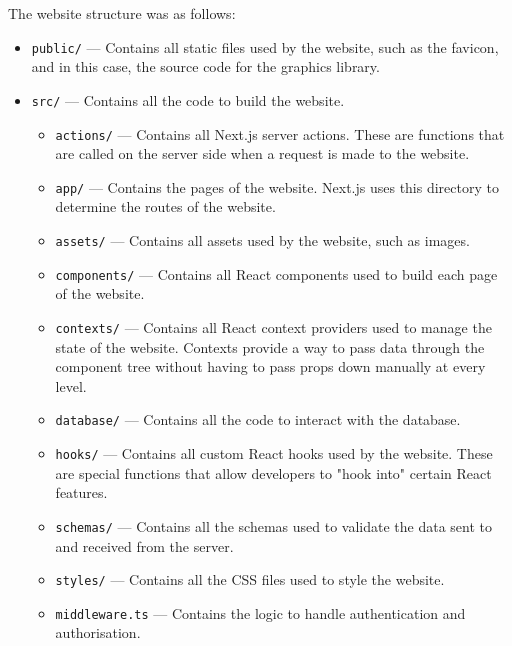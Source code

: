 \documentclass[../main.tex]{subfiles}
\begin{document}
            The website structure was as follows:
            \begin{itemize}
                \item \texttt{public/} — Contains all static files used by the website, such as
                      the favicon, and in this case, the source code for the graphics library.
                \item \texttt{src/} — Contains all the code to build the website.
                      \begin{itemize}
                          \item \texttt{actions/} — Contains all Next.js server actions.
                                These are functions that are called on the server side when a request is made
                                    to the website.
                          \item \texttt{app/} — Contains the pages of the website.
                                Next.js uses this directory to determine the routes of the website.
                          \item \texttt{assets/} — Contains all assets used by the website, such as images.
                          \item \texttt{components/} — Contains all React components used to build each page of
                                the website.
                          \item \texttt{contexts/} — Contains all React context providers used to manage the state
                                of the website.
                                Contexts provide a way to pass data through the component tree without having
                                    to pass props down manually at every level.
                          \item \texttt{database/} — Contains all the code to interact with the database.
                          \item \texttt{hooks/} — Contains all custom React hooks used by the website.
                                These are special functions that allow developers to "hook into" certain React
                                    features.
                          \item \texttt{schemas/} — Contains all the schemas used to validate the data sent to and
                                received from the server.
                          \item \texttt{styles/} — Contains all the CSS files used to style the website.
                          \item \texttt{middleware.ts} — Contains the logic to handle authentication and
                                authorisation.
                      \end{itemize}
            \end{itemize}
\end{document}

